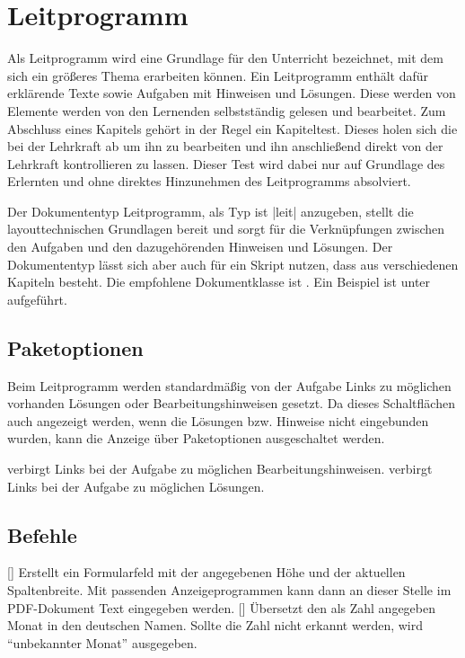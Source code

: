 \section{Leitprogramm}
\label{typ:Leitprogramm}
Als Leitprogramm wird eine Grundlage für den Unterricht bezeichnet, mit dem \SuS sich ein größeres Thema erarbeiten können. Ein Leitprogramm enthält dafür erklärende Texte sowie Aufgaben mit Hinweisen und Lösungen. Diese werden von Elemente werden von den Lernenden selbstständig gelesen und bearbeitet. Zum Abschluss eines Kapitels gehört in der Regel ein Kapiteltest. Dieses holen sich die \SuS bei der Lehrkraft ab um ihn zu bearbeiten und ihn anschließend direkt von der Lehrkraft kontrollieren zu lassen. Dieser Test wird dabei nur auf Grundlage des Erlernten und ohne direktes Hinzunehmen des Leitprogramms absolviert.

Der Dokumententyp Leitprogramm, als Typ ist \verbcode|leit| anzugeben, stellt die layouttechnischen Grundlagen bereit und sorgt für die Verknüpfungen zwischen den Aufgaben und den dazugehörenden Hinweisen und Lösungen. Der Dokumententyp lässt sich aber auch für ein Skript nutzen, dass aus verschiedenen Kapiteln besteht. Die empfohlene Dokumentklasse ist . Ein Beispiel ist unter  aufgeführt.

\subsection{Paketoptionen}
Beim Leitprogramm werden standardmäßig von der Aufgabe Links zu möglichen vorhanden Lösungen oder Bearbeitungshinweisen gesetzt. Da dieses Schaltflächen auch angezeigt werden, wenn die Lösungen bzw. Hinweise nicht eingebunden wurden, kann die Anzeige über Paketoptionen ausgeschaltet werden.
\begin{options}
     verbirgt Links bei der Aufgabe zu möglichen Bearbeitungshinweisen.
     verbirgt Links bei der Aufgabe zu möglichen Lösungen.
\end{options}

\subsection{Befehle}
\begin{commands}
    [] Erstellt ein Formularfeld mit der angegebenen Höhe und der aktuellen Spaltenbreite. Mit passenden Anzeigeprogrammen kann dann an dieser Stelle im PDF-Dokument Text eingegeben werden.
    [] Übersetzt den als Zahl angegeben Monat in den deutschen Namen. Sollte die Zahl nicht erkannt werden, wird \enquote{unbekannter Monat} ausgegeben.
\end{commands}

